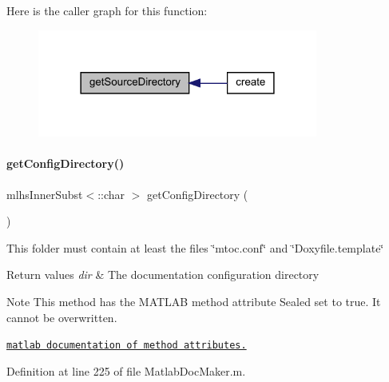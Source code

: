 Here is the caller graph for this function\+:\nopagebreak
\begin{figure}[H]
\begin{center}
\leavevmode
\includegraphics[width=261pt]{class_matlab_doc_maker_a70806462467982623dd808caef7b6b03_icgraph}
\end{center}
\end{figure}
\mbox{\label{class_matlab_doc_maker_ac201c45057310993a26a114403254c41}} 
\paragraph{\texorpdfstring{get\+Config\+Directory()}{getConfigDirectory()}}
{\footnotesize\ttfamily mlhs\+Inner\+Subst$<$\+::char $>$ get\+Config\+Directory (\begin{DoxyParamCaption}{ }\end{DoxyParamCaption})\hspace{0.3cm}{\ttfamily [static]}}

This folder must contain at least the files \char`\"{}mtoc.\+conf\char`\"{} and \char`\"{}\+Doxyfile.\+template\char`\"{}


\begin{DoxyRetVals}{Return values}
{\em dir} & The documentation configuration directory\\
\hline
\end{DoxyRetVals}
\begin{DoxyNote}{Note}
This method has the M\+A\+T\+L\+AB method attribute {\ttfamily Sealed} set to true. It cannot be overwritten. 

\href{http://www.mathworks.com/help/matlab/matlab_oop/method-attributes.html}{\tt matlab documentation of method attributes.} 
\end{DoxyNote}


Definition at line 225 of file Matlab\+Doc\+Maker.\+m.


